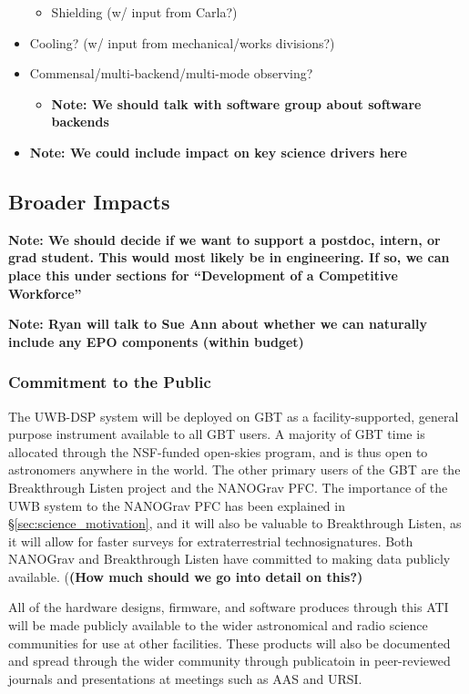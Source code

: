 \documentclass[10pt]{NSF}
\begin{document}
\begin{itemize}
\begin{itemize}
  \item{Shielding (w/ input from Carla?)}
  \end{itemize}
\item{Cooling? (w/ input from mechanical/works divisions?)}
\item{Commensal/multi-backend/multi-mode observing?}
  \begin{itemize}
  \item{\textbf{Note: We should talk with software group about
        software backends}}
  \end{itemize}
\item{\textbf{Note: We could include impact on key science drivers
      here}}
\end{itemize}

\subsection{Broader Impacts}
\label{sec:BI}

\textbf{Note: We should decide if we want to support a postdoc,
  intern, or grad student.  This would most likely be in engineering.
  If so, we can place this under sections for ``Development of a
  Competitive Workforce''}

\textbf{Note: Ryan will talk to Sue Ann about whether we can naturally
  include any EPO components (within budget)}

\subsubsection{Commitment to the Public}
\label{sec:commitment}

The UWB-DSP system will be deployed on GBT as a facility-supported,
general purpose instrument available to all GBT users.  A majority of
GBT time is allocated through the NSF-funded open-skies program, and
is thus open to astronomers anywhere in the world.  The other primary
users of the GBT are the Breakthrough Listen project and the NANOGrav
PFC.  The importance of the UWB system to the NANOGrav PFC has been
explained in \S\ref{sec:science_motivation}, and it will also be
valuable to Breakthrough Listen, as it will allow for faster surveys
for extraterrestrial technosignatures.  Both NANOGrav and Breakthrough
Listen have committed to making data publicly available. (\textbf{(How
  much should we go into detail on this?)}

All of the hardware designs, firmware, and software produces through
this ATI will be made publicly available to the wider astronomical and
radio science communities for use at other facilities.  These products
will also be documented and spread through the wider community through
publicatoin in peer-reviewed journals and presentations at meetings
such as AAS and URSI.  
\end{document}
